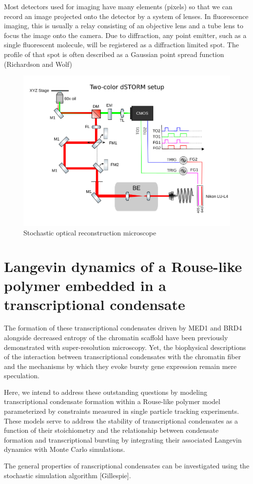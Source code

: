 \documentclass{article}
\begin{document}
Most detectors used for imaging have many elements (pixels) so that we can record an image projected onto the detector by a system of lenses. In fluorescence imaging, this is usually a relay consisting of an objective lens and a tube lens to focus the image onto the camera. Due to diffraction, any point emitter, such as a single fluorescent molecule, will be registered as a diffraction limited spot. The profile of that spot is often described as a Gaussian point spread function (Richardson and Wolf)

\begin{figure}
\centering
\includegraphics[width=12cm]{dSTORM.png}
\caption{Stochastic optical reconstruction microscope}
\end{figure}

\section{Langevin dynamics of a Rouse-like polymer embedded in a transcriptional condensate}

The formation of these transcriptional condensates driven by MED1 and BRD4 alongside decreased entropy of the chromatin scaffold have been previously demonstrated with super-resolution microscopy. Yet, the biophysical descriptions of the interaction between transcriptional condensates with the chromatin fiber and the mechanisms by which they evoke bursty gene expression remain mere speculation. 

Here, we intend to address these outstanding questions by modeling transcriptional condensate formation within a Rouse-like polymer model parameterized by constraints measured in single particle tracking experiments. These models serve to address the stability of transcriptional condensates as a function of their stoichiometry and the relationship between condensate formation and transcriptional bursting by integrating their associated Langevin dynamics with Monte Carlo simulations. 


The general properties of ranscriptional condensates can be investigated using the stochastic simulation algorithm [Gillespie].

 



 
\end{document}
